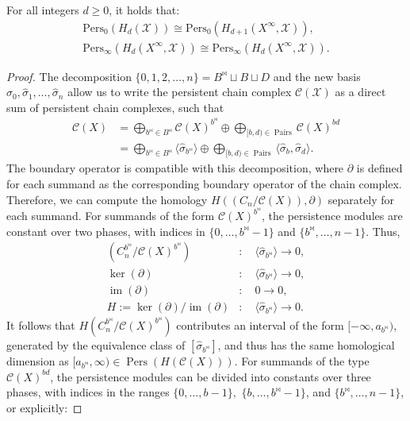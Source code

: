 \begin{theorem}{\cite[Proposition 2.4]{de2011dualities}}
	For all integers $d \geq 0$, it holds that:
	\begin{align*}
		\mathrm{Pers}_0(H_{d}(\mathcal{X})) \cong \mathrm{Pers}_0(H_{d+1}(X^\infty, \mathcal{X})), \nonumber\\
		\mathrm{Pers}_\infty(H_{d}(X^{\infty}, \mathcal{X})) \cong \mathrm{Pers}_\infty(H_{d}(X^{\infty}, \mathcal{X})).
	\end{align*}
\end{theorem}

\begin{proof}{\textit{\cite[Proof of Proposition 2.4]{de2011dualities}}}
The decomposition $\{0,1,2,\ldots,n\} = B^\Join \sqcup B \sqcup D$ and the new basis $\hat{\sigma}_0, \hat{\sigma}_1, \ldots, \hat{\sigma}_n$ allow us to write the persistent chain complex $\mathcal{C}(\mathcal{X})$ as a direct sum of persistent chain complexes, such that
\begin{align}
	\mathcal{C}(X) &= \bigoplus_{b^\Join \in B^\Join} \mathcal{C}(X)^{b^\Join} \oplus \bigoplus_{[b,d) \in \operatorname{Pairs}} \mathcal{C}(X)^{bd} \nonumber\\
	&= \bigoplus_{b^\Join \in B^\Join} \langle \hat{\sigma}_{b^\Join} \rangle \oplus \bigoplus_{[b,d) \in \operatorname{Pairs}} \langle \hat{\sigma}_{b}, \hat{\sigma}_{d} \rangle.
\end{align}
The boundary operator is compatible with this decomposition, where $\partial$ is defined for each summand as the corresponding boundary operator of the chain complex. Therefore, we can compute the homology $H((C_n/\mathcal{C}(X)),\partial)$ separately for each summand. For summands of the form $\mathcal{C}(X)^{b^\Join}$, the persistence modules are constant over two phases, with indices in $\{0,\ldots,b^\Join - 1\}$ and $\{b^\Join, \ldots, n-1\}$. Thus,
\begin{align}
	(C^{b^{\Join}}_n/\mathcal{C}(X)^{b^\Join})&: \quad \langle \hat{\sigma}_{b^\Join}\rangle \rightarrow 0,\nonumber\\
	\ker(\partial)&: \quad \langle \hat{\sigma}_{b^\Join}\rangle \rightarrow 0,\nonumber\\
	\operatorname{im}(\partial)&: \quad 0 \rightarrow 0,\nonumber\\
	H := \ker(\partial) / \operatorname{im}(\partial)&: \quad \langle \hat{\sigma}_{b^\Join}\rangle \rightarrow 0.
\end{align}
It follows that $H(C^{b^\Join}_n/\mathcal{C}(X)^{b^\Join})$ contributes an interval of the form $[-\infty, a_{b^\Join})$, generated by the equivalence class of $[\hat{\sigma}_{b^\Join}]$, and thus has the same homological dimension as $[a_{b^{\Join}}, \infty) \in \operatorname{Pers}(H(\mathcal{C}(X)))$. For summands of the type $\mathcal{C}(X)^{bd}$, the persistence modules can be divided into constants over three phases, with indices in the ranges $\{0,\ldots,b-1\},$ $\{b,\ldots,b^{\Join}-1\}$, and $\{b^\Join,\ldots, n-1\}$, or explicitly:

\end{proof}
